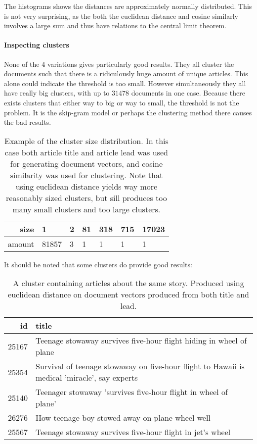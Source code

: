 The histograms shows the distances are approximately normally distributed. This is not very surprising, as the both the euclidean distance and cosine similarly involves a large sum and thus have relations to the central limit theorem.

\paragraph{Inspecting clusters}  None of the 4 variations gives particularly good results. They all cluster the documents such that there is a ridiculously huge amount of unique articles. This alone could indicate the threshold is too small. However simultaneously they all have really big clusters, with up to $31478$ documents in one case. Because there exists clusters that either way to big or way to small, the threshold is not the problem. It is the skip-gram model or perhaps the clustering method there causes the bad results.

\begin{table}[H]
\centering
\begin{tabular}{r|l l l l l l }
size & 1 & 2 & 81 & 318 & 715 & 17023 \\ \hline
amount & 81857 & 3 & 1 & 1 & 1 & 1
\end{tabular}
\caption{Example of the cluster size distribution. In this case both article title and article lead was used for generating document vectors, and cosine similarity was used for clustering. Note that using euclidean distance yields way more reasonably sized clusters, but sill produces too many small clusters and too large clusters.}
\end{table}

It should be noted that some clusters do provide good results:

\begin{table}[H]
\centering
\begin{tabular}{r|p{10cm}}
id & title \\ \hline
 25167 & Teenage stowaway survives five-hour flight hiding in wheel of plane \\
 25354 & Survival of teenage stowaway on five-hour flight to Hawaii is medical 'miracle', say experts \\
 25140 & Teenager stowaway 'survives five-hour flight in wheel of plane' \\
 26276 & How teenage boy stowed away on plane wheel well \\
 25567 & Teenage stowaway survives five-hour flight in jet's wheel
\end{tabular}
\caption{A cluster containing articles about the same story. Produced using euclidean distance on document vectors produced from both title and lead.}
\end{table}
 
